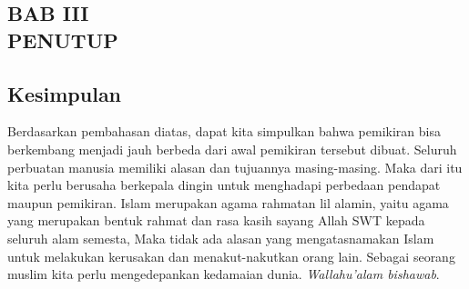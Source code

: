 \documentclass[a4paper,12 pt]{article}%
\begin{document}
\begin{center}
    \section*{BAB III\\PENUTUP}
\end{center}
\setcounter{subsection}{0}%

\subsection{Kesimpulan}
Berdasarkan pembahasan diatas, dapat kita simpulkan bahwa pemikiran bisa berkembang menjadi jauh
berbeda dari awal pemikiran tersebut dibuat. Seluruh perbuatan manusia memiliki alasan dan tujuannya
masing-masing. Maka dari itu kita perlu berusaha berkepala dingin untuk menghadapi perbedaan 
pendapat maupun pemikiran. Islam merupakan agama rahmatan lil alamin, yaitu agama yang merupakan 
bentuk rahmat dan rasa kasih sayang Allah SWT kepada seluruh alam semesta, Maka tidak ada alasan
yang mengatasnamakan Islam untuk melakukan kerusakan dan menakut-nakutkan orang lain. Sebagai 
seorang muslim kita perlu mengedepankan kedamaian dunia. \textit{Wallahu'alam bishawab}.

\clearpage
\nocite{*}
\printbibliography[title=DAFTAR PUSTAKA]{}
\end{document}
